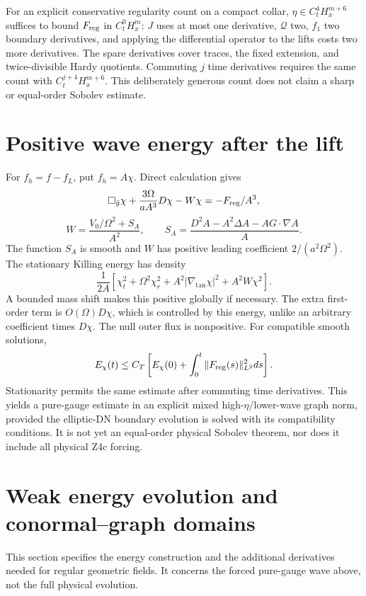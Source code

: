 \documentclass[11pt]{article}
\begin{document}
For an explicit conservative regularity count on a compact collar, $\eta\in C_t^4H_x^{m+6}$ suffices to bound $F_{\rm reg}$ in $C_t^0H_x^m$: $J$ uses at most one derivative, $\mathcal Q$ two, $f_1$ two boundary derivatives, and applying the differential operator to the lifts costs two more derivatives. The spare derivatives cover traces, the fixed extension, and twice-divisible Hardy quotients. Commuting $j$ time derivatives requires the same count with $C_t^{j+4}H_x^{m+6}$. This deliberately generous count does not claim a sharp or equal-order Sobolev estimate.

\section{Positive wave energy after the lift}
For $f_h=f-f_L$, put $f_h=A\chi$. Direct calculation gives
\[
 \Box_{\bar g}\chi+\frac{3\Omega}{aA^3}D\chi-W\chi
 =-F_{\rm reg}/A^3,
\]
\[
 W=\frac{V_0/\Omega^2+S_A}{A^2},\qquad
 S_A=\frac{D^2A-A^2\Delta A-AG\cdot\nabla A}{A}.
\]
The function $S_A$ is smooth and $W$ has positive leading coefficient $2/(a^2\Omega^2)$. The stationary Killing energy has density
\[
 \frac1{2A}\left[\chi_t^2+\Omega^2\chi_r^2
 +A^2|\nabla_{\tan}\chi|^2+A^2W\chi^2\right].
\]
A bounded mass shift makes this positive globally if necessary. The extra first-order term is $O(\Omega)D\chi$, which is controlled by this energy, unlike an arbitrary coefficient times $D\chi$. The null outer flux is nonpositive. For compatible smooth solutions,
\[
 E_\chi(t)\le C_T\left[E_\chi(0)+\int_0^t\|F_{\rm reg}(s)\|_{L^2}^2ds\right].
\]
Stationarity permits the same estimate after commuting time derivatives. This yields a pure-gauge estimate in an explicit mixed high-$\eta$/lower-wave graph norm, provided the elliptic-DN boundary evolution is solved with its compatibility conditions. It is not yet an equal-order physical Sobolev theorem, nor does it include all physical Z4c forcing.
\section{Weak energy evolution and conormal--graph domains}
This section specifies the energy construction and the additional derivatives needed for regular geometric fields. It concerns the forced pure-gauge wave above, not the full physical evolution.
\end{document}
